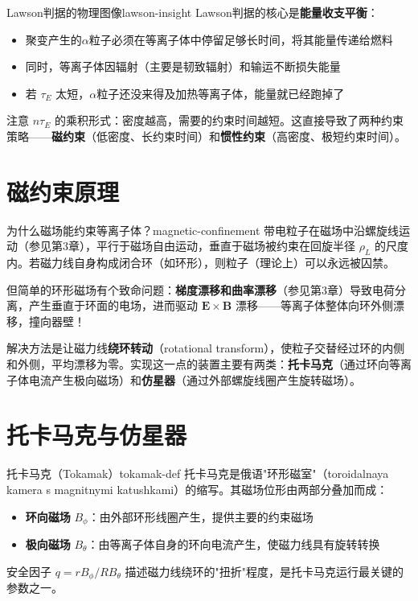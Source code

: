 \documentclass[12pt,a4paper,openany,oneside]{book}
\newcommand{\vect}[1]{\bm{#1}}
\newcommand{\difficulty}[1]{\marginnote{\hfill\textcolor{coverMid!80}{\rule[-0.1em]{2pt}{0.9em}}\,\textcolor{coverMid}{\footnotesize\textbf{[#1]}}}}
\begin{document}
\begin{insight}{Lawson判据的物理图像}{lawson-insight}
Lawson判据的核心是\textbf{能量收支平衡}：
\begin{itemize}
\item 聚变产生的$\alpha$粒子必须在等离子体中停留足够长时间，将其能量传递给燃料
\item 同时，等离子体因辐射（主要是韧致辐射）和输运不断损失能量
\item 若 $\tau_E$ 太短，$\alpha$粒子还没来得及加热等离子体，能量就已经跑掉了
\end{itemize}

注意 $n\tau_E$ 的乘积形式：密度越高，需要的约束时间越短。这直接导致了两种约束策略——\textbf{磁约束}（低密度、长约束时间）和\textbf{惯性约束}（高密度、极短约束时间）。
\end{insight}

\section{磁约束原理}\difficulty{基础}

\begin{insight}{为什么磁场能约束等离子体？}{magnetic-confinement}
带电粒子在磁场中沿螺旋线运动（参见第3章），平行于磁场自由运动，垂直于磁场被约束在回旋半径 $\rho_L$ 的尺度内。若磁力线自身构成闭合环（如环形），则粒子（理论上）可以永远被囚禁。

但简单的环形磁场有个致命问题：\textbf{梯度漂移和曲率漂移}（参见第3章）导致电荷分离，产生垂直于环面的电场，进而驱动 $\vect{E}\times\vect{B}$ 漂移——等离子体整体向环外侧漂移，撞向器壁！

解决方法是让磁力线\textbf{绕环转动}（rotational transform），使粒子交替经过环的内侧和外侧，平均漂移为零。实现这一点的装置主要有两类：\textbf{托卡马克}（通过环向等离子体电流产生极向磁场）和\textbf{仿星器}（通过外部螺旋线圈产生旋转磁场）。
\end{insight}

\section{托卡马克与仿星器}\difficulty{基础}

\begin{definition}{托卡马克（Tokamak）}{tokamak-def}
托卡马克是俄语"环形磁室"（toroidalnaya kamera s magnitnymi katushkami）的缩写。其磁场位形由两部分叠加而成：
\begin{itemize}
\item \textbf{环向磁场} $B_\phi$：由外部环形线圈产生，提供主要的约束磁场
\item \textbf{极向磁场} $B_\theta$：由等离子体自身的环向电流产生，使磁力线具有旋转转换
\end{itemize}
安全因子 $q = rB_\phi/RB_\theta$ 描述磁力线绕环的"扭折"程度，是托卡马克运行最关键的参数之一。
\end{definition}
\end{document}
